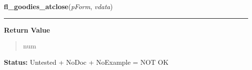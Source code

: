     \label{xformslib:library:fl_goodies_atclose}

    \vspace{0.5ex}

\hspace{.8\funcindent}\begin{boxedminipage}{\funcwidth}

    \raggedright \textbf{fl\_goodies\_atclose}(\textit{pForm}, \textit{vdata})

    \vspace{-1.5ex}

    \rule{\textwidth}{0.5\fboxrule}
\setlength{\parskip}{2ex}
\setlength{\parskip}{1ex}
      \textbf{Return Value}
    \vspace{-1ex}

      \begin{quote}
      num

      \end{quote}

\textbf{Status:} Untested + NoDoc + NoExample = NOT OK



    \end{boxedminipage}

    \label{xformslib:library:fl_create_input}

    \vspace{0.5ex}

